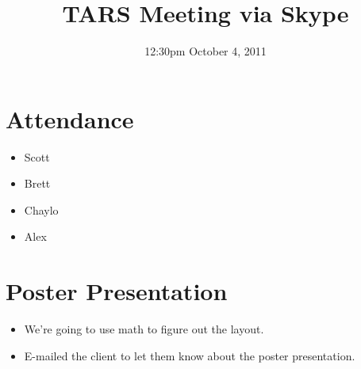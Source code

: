 \documentclass{article}
\begin{document}
\title{TARS Meeting via Skype}
\date{12:30pm October 4, 2011}
\maketitle

\section{Attendance}
\begin{itemize}
\item Scott
\item Brett
\item Chaylo
\item Alex
\end{itemize}

\section{Poster Presentation}
\begin{itemize}
\item We're going to use math to figure out the layout.
\item E-mailed the client to let them know about the poster presentation.
\end{itemize}
\end{document}
